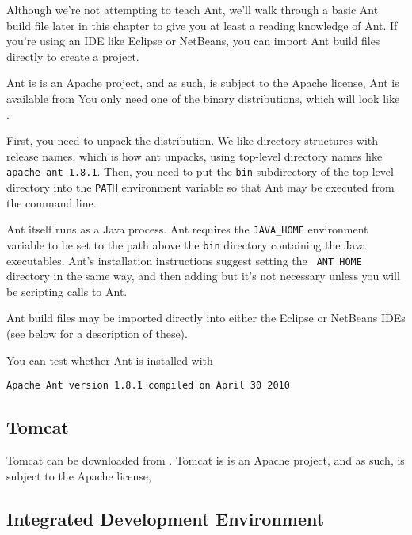 Although we're not attempting to teach Ant, we'll walk through a basic
Ant build file later in this chapter to give you at least a reading
knowledge of Ant.  If you're using an IDE like Eclipse or NetBeans,
you can import Ant build files directly to create a project.

Ant is is an Apache project, and as such, is subject to the Apache license,
%
%
Ant is available from 
%
%
You only need one of the binary distributions, which will
look like .

First, you need to unpack the distribution.  We like directory
structures with release names, which is how ant unpacks, using
top-level directory names like {\tt apache-ant-1.8.1}.  Then, you need
to put the {\tt bin} subdirectory of the top-level directory into the
{\tt PATH} environment variable so that Ant may be executed from the
command line.

Ant itself runs as a Java process.
Ant requires the {\tt JAVA\_HOME} environment variable to be set to
the path above the {\tt bin} directory containing the Java
executables.  Ant's installation instructions suggest setting the {\tt
ANT\_HOME} directory in the same way, and then adding but it's not
necessary unless you will be scripting calls to Ant.

Ant build files may be imported directly into either the Eclipse or
NetBeans IDEs (see below for a description of these).

You can test whether Ant is installed with
%
\begin{verbatim}
Apache Ant version 1.8.1 compiled on April 30 2010
\end{verbatim}


\subsection{Tomcat}\label{section:intro-tomcat}

Tomcat can be downloaded from
%
.
%
Tomcat is is an Apache project, and as such, is subject to the Apache license,
%
%

\subsection{Integrated Development Environment}

